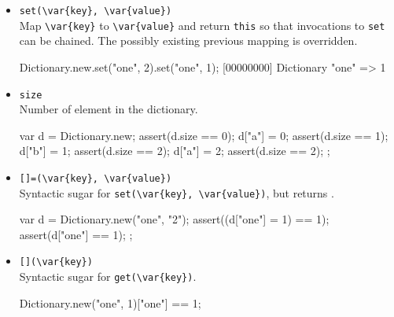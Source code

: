 \begin{itemize}
\item \lstinline|set(\var{key}, \var{value})|\\
  Map \lstinline|\var{key}| to \lstinline|\var{value}| and return
  \lstinline|this| so that invocations to \lstinline|set| can be
  chained.  The possibly existing previous mapping is overridden.

\begin{urbiscript}[firstnumber=last]
Dictionary.new.set("one", 2).set("one", 1);
[00000000] Dictionary {"one" => 1}
\end{urbiscript}

\item \lstinline|size|\\
  Number of element in the dictionary.

\begin{urbiscript}[firstnumber=last]
{
  var d = Dictionary.new;
  assert(d.size == 0);
  d["a"] = 0;
  assert(d.size == 1);
  d["b"] = 1;
  assert(d.size == 2);
  d["a"] = 2;
  assert(d.size == 2);
};
\end{urbiscript}

\item \lstinline|[]=(\var{key}, \var{value})|\\
  Syntactic sugar for \lstinline|set(\var{key}, \var{value})|, but
  returns .

\begin{urbiscript}[firstnumber=last]
{
  var d = Dictionary.new("one", "2");
  assert((d["one"] = 1) == 1);
  assert(d["one"] == 1);
};
\end{urbiscript}

\item \lstinline|[](\var{key})|\\
  Syntactic sugar for \lstinline|get(\var{key})|.

\begin{urbiassert}[firstnumber=last]
Dictionary.new("one", 1)["one"] == 1;
\end{urbiassert}

\end{itemize}


